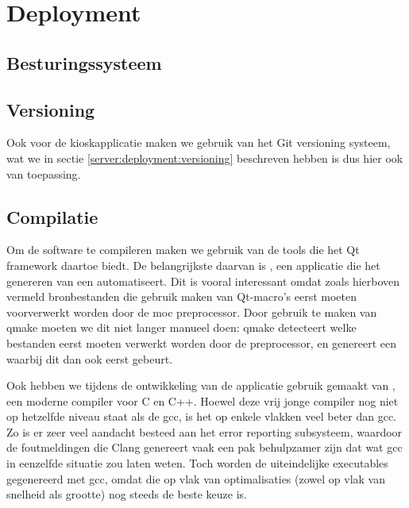 \chapter{Deployment}
\label{kiosk:deployment}

\section{Besturingssysteem}
\label{kiosk:deployment:besturingssysteem}


\section{Versioning}
\label{kiosk:deployment:versioning}

Ook voor de kioskapplicatie maken we gebruik van het Git versioning systeem, wat we in sectie \ref{server:deployment:versioning} beschreven hebben is dus hier ook van toepassing.

\section{Compilatie}
\label{kiosk:deployment:compilatie}

Om de software te compileren maken we gebruik van de tools die het Qt framework daartoe biedt. De belangrijkste daarvan is , een applicatie die het genereren van een  automatiseert. Dit is vooral interessant omdat zoals hierboven vermeld bronbestanden die gebruik maken van Qt-macro's eerst moeten voorverwerkt worden door de \ac{moc} preprocessor. Door gebruik te maken van qmake moeten we dit niet langer manueel doen: qmake detecteert welke bestanden eerst moeten verwerkt worden door de preprocessor, en genereert een  waarbij dit dan ook eerst gebeurt.

Ook hebben we tijdens de ontwikkeling van de applicatie gebruik gemaakt van , een moderne compiler voor C en C++. Hoewel deze vrij jonge compiler nog niet op hetzelfde niveau staat als de \ac{gcc}, is het op enkele vlakken veel beter dan \ac{gcc}. Zo is er zeer veel aandacht besteed aan het error reporting subsysteem, waardoor de foutmeldingen die Clang genereert vaak een pak behulpzamer zijn dat wat \ac{gcc} in eenzelfde situatie zou laten weten. Toch worden de uiteindelijke executables gegenereerd met \ac{gcc}, omdat die op vlak van optimalisaties (zowel op vlak van snelheid als grootte) nog steeds de beste keuze is.

